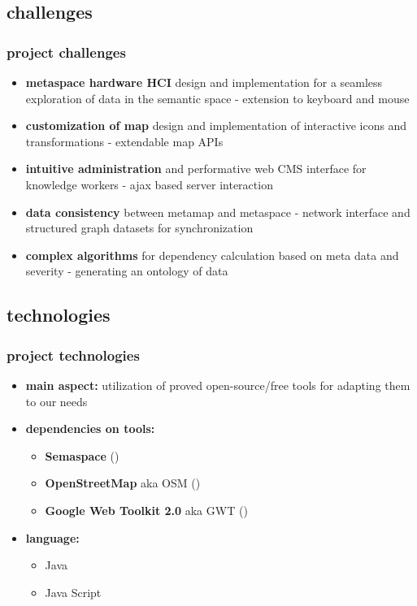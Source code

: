 \documentclass[blue]{beamer}
\begin{document}
\subsection{challenges}
\frame
{
\frametitle{\textbf{project challenges}}
\begin{itemize}
	\item \textbf{metaspace hardware HCI} design and implementation for a seamless exploration of data in the semantic space - extension to keyboard and mouse 
	\item \textbf{customization of map} design and implementation of interactive icons and transformations -  extendable map APIs
	\item \textbf{intuitive administration} and performative web CMS interface for knowledge workers - ajax based server interaction
	\item \textbf{data consistency} between metamap and metaspace - network interface and structured graph datasets for synchronization
	\item \textbf{complex algorithms} for dependency calculation based on meta data and severity - generating an ontology of data
\end{itemize}
}


\subsection{technologies}
\frame
{
\frametitle{\textbf{project technologies}}
\begin{itemize}
\item \textbf{main aspect:} utilization of proved open-source/free tools for adapting them to our needs  
\item \textbf{dependencies on tools:}
  \begin{itemize}
    \item \textbf{Semaspace} ()
    \item \textbf{OpenStreetMap} aka OSM ()
    \item \textbf{Google Web Toolkit 2.0} aka GWT ()
  \end{itemize}
\item \textbf{language:}
	\begin{itemize}
		\item Java
		\item Java Script
	\end{itemize}
\end{itemize}
}
\end{document}
